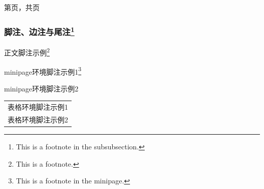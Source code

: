 \documentclass{ctexart}
\begin{document}
            第\thepage 页，共\pageref{LastPage}页
            
        \subsubsection{脚注、边注与尾注\protect\footnote{This is a footnote in the subsubsection.}} %
            正文脚注示例\footnote{This is a footnote.}

            \begin{minipage}{\linewidth}
                minipage环境脚注示例1\footnote{This is a footnote in the minipage.} %

                minipage环境脚注示例2\footnotemark %
            \end{minipage}

            \begin{tabular}{l}
                表格环境脚注示例1\footnotemark\\
                表格环境脚注示例2\footnotemark
            \end{tabular}
            

\end{document}
